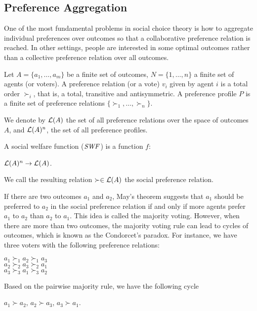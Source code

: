 \subsection{Preference Aggregation}
One of the most fundamental problems in social choice theory is how to
aggregate individual preferences over outcomes so that a
collaborative preference relation is reached.
In other settings, people are interested in some optimal outcomes
rather than a collective preference relation over all outcomes.

\begin{definition}
	Let $A=\{a_1,\ldots,a_m\}$ be a finite set of outcomes,
	$N=\{1,\ldots,n\}$ a finite set of agents (or voters).
	A preference relation (or a vote) $v_i$ given by agent $i$ 
	is a total order $\succ_i$,
	that is, a total, transitive and antisymmetric.
	A preference profile $P$ is a finite set of preference relations
	$\{\succ_1, \ldots, \succ_n\}$.
\end{definition}

We denote by $\mathcal{L}(A)$ the set of all preference relations over
the space of outcomes $A$, and $\mathcal{L}(A)^n$, the set of all
preference profiles.

\begin{definition}
	A social welfare function ($\it{SWF}$) is a function $f$:
	\begin{center}
		$\mathcal{L}(A)^n \rightarrow \mathcal{L}(A)$.
	\end{center}
	We call the resulting relation $\succ \in \mathcal{L}(A)$ the social preference relation.
\end{definition}

If there are two outcomes $a_1$ and $a_2$,
May's theorem \cite{May52} suggests that $a_1$ should be
preferred to $a_2$ in the social preference relation
if and only if more agents prefer $a_1$ to $a_2$ than
$a_2$ to $a_1$.
This idea is called the majority voting.
However, when there are more than two outcomes,
the majority voting rule can lead to cycles of
outcomes, which is known as the Condorcet's paradox.
For instance, we have three voters with the following
preference relations:
\begin{center}
	$a_1 \succ_1 a_2 \succ_1 a_3$\\
	$a_2 \succ_2 a_3 \succ_2 a_1$\\
	$a_3 \succ_3 a_1 \succ_3 a_2$
\end{center}
Based on the pairwise majority rule, we have the following cycle
\begin{center}
	$a_1 \succ a_2$, $a_2 \succ a_3$, $a_3 \succ a_1$. 
\end{center}

